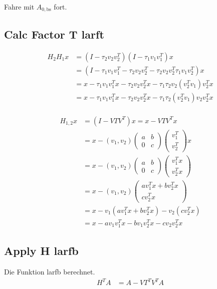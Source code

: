 Fahre mit $A_{0, \text{bs}}$ fort.

\subsection{Calc Factor T larft}
\cite{Joffrain:2006:AHT:1141885.1141886}

\begin{align*}
	H_2 H_1 x &= (I-\tau_2 v_2 v_2^T)(I-\tau_1 v_1 v_1^T)x\\
	&= (I - \tau_1 v_1 v_1^T - \tau_2 v_2 v_2^T - \tau_2 v_2 v_2^T \tau_1 v_1 v_2^T) x\\
  &= x - \tau_1 v_1 v_1^T x - \tau_2 v_2 v_2^T x - \tau_1 \tau_2 v_2 (v_2^T v_1 )v_2^T x\\
  &= x - \tau_1 v_1 v_1^T x - \tau_2 v_2 v_2^T x - \tau_1 \tau_2 (v_2^T v_1 ) v_2 v_2^T x\\
\end{align*}

\begin{align*}
  H_{1,2} x &= (I - V T V^T) x = x - V T V^T x\\
  &= x - (v_1, v_2)
  \begin{pmatrix}
    a & b \\ 0 & c
  \end{pmatrix}
  \begin{pmatrix}
    v_1^T \\ v_2^T 
  \end{pmatrix}
  x\\
  &= x - (v_1, v_2)
  \begin{pmatrix}
    a & b \\ 0 & c
  \end{pmatrix}
  \begin{pmatrix}
    v_1^T x \\ v_2^T x
  \end{pmatrix}\\
  &= x - (v_1, v_2)
  \begin{pmatrix}
    a v_1^T x + b v_2^T x\\  c v_2^T x
  \end{pmatrix}\\
  &= x - v_1(a v_1^T x + b v_2^T x) - v_2 (c v_2^T x)\\
  &= x - a v_1 v_1^T x - b v_1 v_2^T x - c v_2 v_2^T x
\end{align*}

\subsection{Apply H larfb}
Die Funktion larfb berechnet.
\begin{align}
	H^T A &= A - V T^T V^T A
\end{align}

